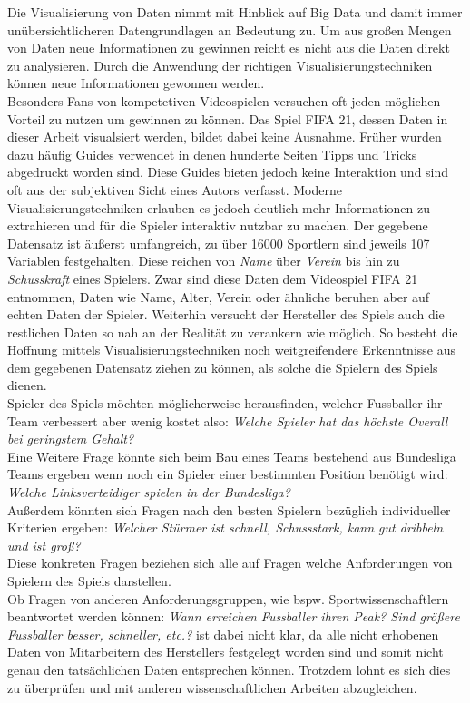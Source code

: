 \documentclass[usegeometry=true]{scrartcl}
\begin{document}
Die Visualisierung von Daten nimmt mit Hinblick auf Big Data und damit immer unübersichtlicheren Datengrundlagen an Bedeutung zu. Um aus großen Mengen von Daten neue Informationen zu gewinnen reicht es nicht aus die Daten direkt zu analysieren. Durch die Anwendung der richtigen Visualisierungstechniken können neue Informationen gewonnen werden.\\
Besonders Fans von kompetetiven Videospielen versuchen oft jeden möglichen Vorteil zu nutzen um gewinnen zu können.
Das Spiel FIFA 21, dessen Daten in dieser Arbeit visualsiert werden, bildet dabei keine Ausnahme.
Früher wurden dazu häufig Guides verwendet in denen hunderte Seiten Tipps und Tricks abgedruckt worden sind. Diese Guides bieten jedoch keine Interaktion und sind oft aus der subjektiven Sicht eines Autors verfasst. 
Moderne Visualisierungstechniken erlauben es jedoch deutlich mehr Informationen zu extrahieren und für die Spieler interaktiv nutzbar zu machen.
Der gegebene Datensatz ist äußerst umfangreich, zu über 16000 Sportlern sind jeweils 107 Variablen festgehalten. Diese reichen von \textit{Name} über \textit{Verein} bis hin zu \textit{Schusskraft} eines Spielers.
Zwar sind diese Daten dem Videospiel FIFA 21 entnommen, Daten wie Name, Alter, Verein oder ähnliche beruhen aber auf echten Daten der Spieler. Weiterhin versucht der Hersteller des Spiels auch die restlichen Daten so nah an der Realität zu verankern wie möglich.
So besteht die Hoffnung mittels Visualisierungstechniken noch weitgreifendere Erkenntnisse aus dem gegebenen Datensatz ziehen zu können, als solche die Spielern des Spiels dienen.\\
Spieler des Spiels möchten möglicherweise herausfinden, welcher Fussballer ihr Team verbessert aber wenig kostet also: \textit{Welche Spieler hat das höchste Overall bei geringstem Gehalt?}\\
Eine Weitere Frage könnte sich beim Bau eines Teams bestehend aus Bundesliga Teams ergeben wenn noch ein Spieler einer bestimmten Position benötigt wird: \textit{Welche Linksverteidiger spielen in der Bundesliga?}\\
Außerdem könnten sich Fragen nach den besten Spielern bezüglich individueller Kriterien ergeben: \textit{Welcher Stürmer ist schnell, Schussstark, kann gut dribbeln und ist groß?}\\
Diese konkreten Fragen beziehen sich alle auf Fragen welche Anforderungen von Spielern des Spiels darstellen.\\
Ob Fragen von anderen Anforderungsgruppen, wie bspw. Sportwissenschaftlern beantwortet werden können: \textit{Wann erreichen Fussballer ihren Peak? Sind größere Fussballer besser, schneller, etc.?} ist dabei nicht klar, da alle nicht erhobenen Daten von Mitarbeitern des Herstellers festgelegt worden sind und somit nicht genau den tatsächlichen Daten entsprechen können. Trotzdem lohnt es sich dies zu überprüfen und mit anderen wissenschaftlichen Arbeiten abzugleichen.
\end{document}
